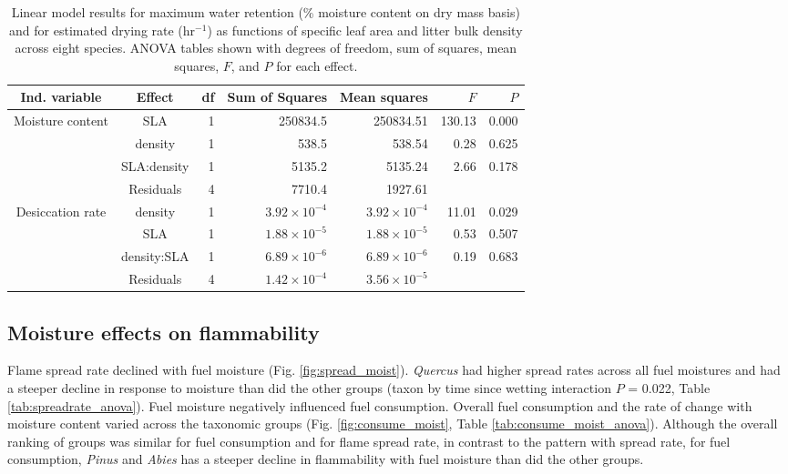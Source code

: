 \documentclass[fire,article,submit,moreauthors,pdftex]{Definitions/mdpi}
\begin{document}
\begin{table}[H]
  \caption{Linear model results for maximum water retention (\% moisture content on dry mass basis) and for estimated drying rate (hr$^{-1}$) as functions of specific leaf area and litter bulk density across eight species. ANOVA tables shown with degrees of freedom, sum of squares, mean squares, $F$, and $P$ for each effect.}
  \label{tab:mc_di_anova}
\centering

\begin{tabular}{ccrrrrr}
  \toprule
Ind. variable & Effect & df & Sum of Squares & Mean squares & $F$ & $P$ \\ 
  \midrule
Moisture content & SLA & 1 & 250834.5 & 250834.51 & 130.13 & 0.000 \\ 
  & density & 1 & 538.5 & 538.54 & 0.28 & 0.625 \\ 
  & SLA:density & 1 & 5135.2 & 5135.24 & 2.66 & 0.178 \\ 
  & Residuals & 4 & 7710.4 & 1927.61 &  &  \\ 
  \midrule
  
Desiccation rate & density & 1 & $3.92 \times 10^{-4}$ & $3.92 \times 10^{-4}$ & 11.01 & 0.029 \\ 
 &  SLA & 1 & $1.88 \times 10^{-5}$ & $1.88 \times 10^{-5}$ & 0.53 & 0.507 \\ 
 &  density:SLA & 1 & $6.89 \times 10^{-6}$ & $6.89 \times 10^{-6}$ & 0.19 & 0.683 \\ 
 &  Residuals & 4 & $1.42 \times 10^{-4}$ & $3.56 \times 10^{-5}$ &  &  \\ 
   \bottomrule

\end{tabular}
\end{table}


\subsection{Moisture effects on flammability}


Flame spread rate declined with fuel moisture (Fig. \ref{fig:spread_moist}). \emph{Quercus} had higher spread rates across all fuel moistures and had a steeper decline in response to moisture than did the other groups (taxon by time since wetting interaction $P$ = 0.022, Table \ref{tab:spreadrate_anova}). Fuel moisture negatively influenced fuel consumption. Overall fuel consumption and the rate of change with moisture content varied across the taxonomic groups (Fig. \ref{fig:consume_moist}, Table \ref{tab:consume_moist_anova}). Although the overall ranking of groups was similar for fuel consumption and for flame spread rate, in contrast to the pattern with spread rate, for fuel consumption, \emph{Pinus} and \emph{Abies} has a steeper decline in flammability with fuel moisture than did the other groups.
\end{document}
